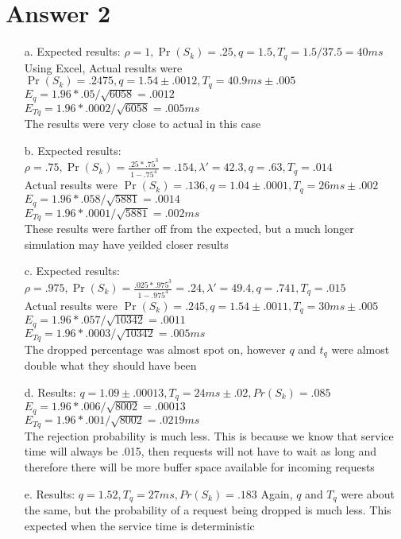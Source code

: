 \documentclass[11pt]{article}
\theoremstyle{definition}
\begin{document}
\section*{Answer 2}
\begin{enumerate}
	\item[a.] Expected results: $\rho = 1, \Pr(S_k) = .25, q = 1.5, T_q = 1.5/37.5 = 40ms$\\
	Using Excel, Actual results were $\Pr(S_k) = .2475, q = 1.54 \pm .0012, T_q = 40.9ms \pm .005$\\
	$E_q = 1.96 * .05 / \sqrt{6058} = .0012$\\
	$E_{Tq} = 1.96 * .0002 / \sqrt{6058} = .005ms$\\
	The results were very close to actual in this case\\
	
	\item[b.] Expected results: $\rho = .75, \Pr(S_k) = \frac{.25 * .75^3}{1 - .75^4} = .154, \lambda' = 42.3, q = .63, T_q = .014$\\
	Actual results were $\Pr(S_k) = .136, q = 1.04 \pm .0001, T_q = 26ms \pm .002$\\
	$E_q = 1.96 * .058 / \sqrt{5881} = .0014$\\
	$E_{Tq} = 1.96 * .0001 / \sqrt{5881} = .002ms$\\
	These results were farther off from the expected, but a much longer simulation may have yeilded closer results
	
	\item[c.] Expected results: $\rho = .975, \Pr(S_k) = \frac{.025 * .975^3}{1 -.975^4} = .24, \lambda' = 49.4, q = .741, T_q = .015$\\
	Actual results were $\Pr(S_k) = .245, q = 1.54 \pm .0011, T_q = 30ms \pm .005$\\
	$E_q = 1.96 * .057 / \sqrt{10342} = .0011$\\
	$E_{Tq} = 1.96 * .0003 / \sqrt{10342} = .005ms$\\
	The dropped percentage was almost spot on, however $q$ and $t_q$ were almost double what they should have been
	
	\item[d.] Results: $q = 1.09\pm .00013, T_q = 24ms \pm .02, Pr(S_k) = .085$
	$E_q = 1.96 * .006 / \sqrt{8002} = .00013$\\
	$E_{Tq} = 1.96 * .001 / \sqrt{8002} = .0219ms$\\
	The rejection probability is much less.  This is because we know that service time will always be .015, then requests will not have to wait as long and therefore	
	there will be more buffer space available for incoming requests
	
	\item[e.] Results: $q = 1.52, T_q = 27ms, Pr(S_k) = .183$
	Again, $q$ and $T_q$ were about the same, but the probability of a request being dropped is much less.  This expected when the service time is deterministic

\end{enumerate}
	
\end{document}
